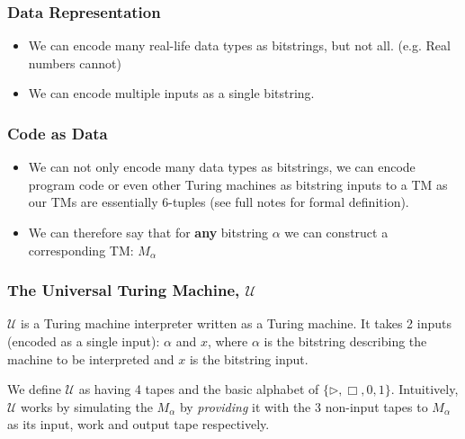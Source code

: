 \documentclass{beamer}
\newcommand{\U}{\mathcal{U}}
\begin{document}
\begin{frame}
  \frametitle{Data Representation}
  \begin{itemize}
    \item We can encode many real-life data types as bitstrings, but not all. (e.g. Real numbers cannot)
    \item We can encode multiple inputs as a single bitstring.
  \end{itemize}
\end{frame}

\begin{frame}
  \frametitle{Code as Data}
  \begin{itemize}
    \item We can not only encode many data types as bitstrings, we can encode program code or even other Turing machines as bitstring inputs to a TM as our TMs are essentially 6-tuples (see full notes for formal definition).
    \item We can therefore say that for \textbf{any} bitstring \(\alpha\) we can construct a corresponding TM:  $M_{\alpha}$
  \end{itemize}
\end{frame}

\begin{frame}
  \frametitle{The Universal Turing Machine, $\U$}

  $\U$ is a Turing machine interpreter written as a Turing machine. It takes 2 inputs (encoded as a single input): $\alpha$ and $x$, where $\alpha$ is the bitstring describing the machine to be interpreted and $x$ is the bitstring input.

  We define $\U$ as having 4 tapes and the basic alphabet of $\{ \rhd, \Box, 0,1 \} $.  Intuitively, $\U$ works by simulating the $M_{\alpha}$ by \textit{providing} it with the 3 non-input tapes to $M_{\alpha}$ as its input, work and output tape respectively.
\end{frame}
\end{document}
